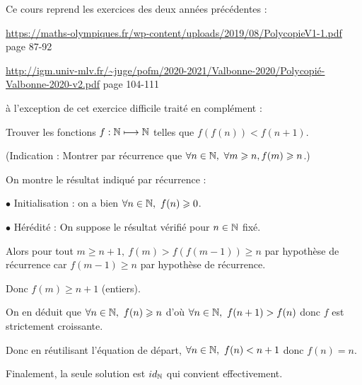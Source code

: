\author{Matthieu Bouyer}
Ce cours reprend les exercices des deux années précédentes :

\url{https://maths-olympiques.fr/wp-content/uploads/2019/08/PolycopieV1-1.pdf}
page 87-92

\url{http://igm.univ-mlv.fr/~juge/pofm/2020-2021/Valbonne-2020/Polycopié-Valbonne-2020-v2.pdf}
page 104-111

à l'exception de cet exercice difficile traité en complément :

\begin{exo}
Trouver les fonctions $f : \mathbb N\longmapsto\mathbb N$ telles que $f(f(n)) < f(n + 1)$.

(Indication : Montrer par récurrence que $\forall n\in\mathbb N,~\forall m\geqslant n, f(m)\geqslant n$.)
\end{exo}

\begin{sol}
On montre le résultat indiqué par récurrence :

$\bullet$ Initialisation : on a bien $\forall n\in\mathbb N,~f(n)\geqslant0$.

$\bullet$ Hérédité : On suppose le résultat vérifié pour $n\in\mathbb N$ fixé.

Alors pour tout $m\ge n+1,~f(m)>f(f(m-1))\ge n$ par hypothèse de récurrence car $f(m-1)\ge n$ par hypothèse de récurrence.

Donc $f(m)\ge n+1$ (entiers).

\bigskip

On en déduit que $\forall n\in\mathbb N,~f(n)\geqslant n$ d'où $\forall n\in\mathbb N,~f(n+1)>f(n)$ donc $f$ est strictement croissante.

Donc en réutilisant l'équation de départ, $\forall n\in\mathbb N,~f(n)<n+1$ donc $f(n)=n$.

Finalement, la seule solution est $id_\mathbb N$ qui convient effectivement.
\end{sol}

